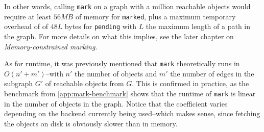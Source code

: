 \bigskip
In other words, calling \texttt{mark} on a graph with a million reachable objects would require at least \(56 MB\) of memory for \texttt{marked}, plus a maximum temporary overhead of of \(48L\) bytes for \texttt{pending} with \(L\) the maximum length of a path in the graph. For more details on what this implies, see the later chapter on \emph{Memory-constrained marking}.

As for runtime, it was previously mentioned that \texttt{mark} theoretically runs in \(O(n' + m')\)--with \(n'\) the number of objects and \(m'\) the number of edges in the subgraph \(G'\) of reachable objects from \(G\). This is confirmed in practice, as the benchmark from \cref{app:mark-benchmark} shows that the runtime of \texttt{mark} is linear in the number of objects in the graph. Notice that the coefficient varies depending on the backend currently being used--which makes sense, since fetching the objects on disk is obviously slower than in memory.